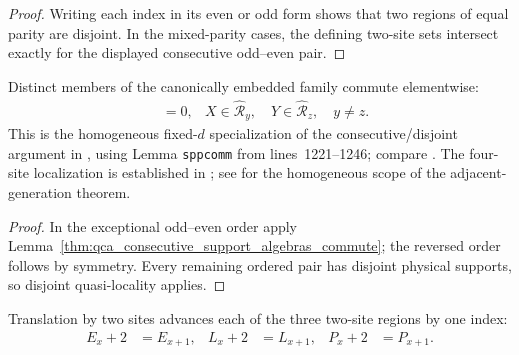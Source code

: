 \begin{proof}\leanok
    Writing each index in its even or odd form shows that two regions of equal parity
    are disjoint.  In the mixed-parity cases, the defining two-site sets
    intersect exactly for the displayed consecutive odd--even pair.
\end{proof}

\begin{lemma}
    \label{thm:qca_site_indexed_support_algebras_commute}
    \leanok
    Distinct members of the canonically embedded family commute elementwise:
    \begin{align}
        [X,Y] & =0,
              & X\in\widehat{\mathcal R}_y,\quad
        Y\in\widehat{\mathcal R}_z,\quad y\ne z.
    \end{align}
    This is the homogeneous fixed-$d$ specialization of the
    consecutive/disjoint argument in
    \cite[lines~1270--1274]{Gross2012IndexTheory}, using Lemma
    \texttt{sppcomm} from lines~1221--1246; compare
    \cite[lines~1174--1194]{SchumacherWerner2004QCA}.  The four-site localization is established in
    \cite[lines~2313--2329]{Cirac2017MPU}; see
    \cite{gap:gnvw12_site_dependent_adjacent_generation_scope} for the
    homogeneous scope of the adjacent-generation theorem.
\end{lemma}

\begin{proof}\leanok
    In the exceptional odd--even order apply
    Lemma~\ref{thm:qca_consecutive_support_algebras_commute}; the reversed
    order follows by symmetry.  Every remaining ordered pair has disjoint
    physical supports, so disjoint quasi-locality applies.
\end{proof}

\begin{lemma}
    \label{lem:qca_pair_region_two_site_translation}
    \leanok
    Translation by two sites advances each of the three two-site regions by
    one index:
    \begin{align}
        E_x+2 & =E_{x+1}, &
        L_x+2 & =L_{x+1}, &
        P_x+2 & =P_{x+1}.
        \label{eq:qca_pair_region_two_site_translation}
    \end{align}
\end{lemma}

